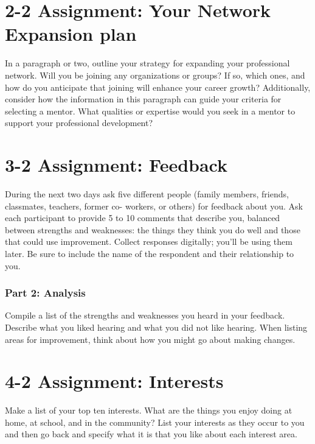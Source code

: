 \hrulefill

\hrulefill

\hrulefill

\hrulefill

\hrulefill

\clearpage  \section*{2-2 Assignment: Your Network Expansion plan}
 
In a paragraph or two, outline your strategy for expanding your professional network. Will you be joining any organizations or groups? If so, which ones, and how do you anticipate that joining will enhance your career growth? Additionally, consider how the information in this paragraph can guide your criteria for selecting a mentor. What qualities or expertise would you seek in a mentor to support your professional development?

\clearpage \section*{3-2 Assignment: Feedback}
 

During the next two days ask five different people (family members, friends, classmates, teachers, former co- workers, or others) for feedback about you. Ask each participant to provide 5 to 10 comments that describe you, balanced between strengths and weaknesses: the things they think you do well and those that could use improvement. Collect responses digitally; you'll be using them later. Be sure to include the name of the respondent and their relationship to you.
\subsubsection*{Part 2: Analysis}

Compile a list of the strengths and weaknesses you heard in your feedback. Describe what you liked hearing and what you did not like hearing. When listing areas for improvement, think about how you might go about making changes.

\clearpage \section*{4-2 Assignment: Interests}
 
Make a list of your top ten interests. What are the things you enjoy doing at home, at school, and in the community? List your interests as they occur to you and then go back and specify what it is that you like about each interest area.

